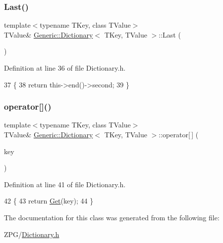 \subsubsection{\texorpdfstring{Last()}{Last()}}
{\footnotesize\ttfamily template$<$typename T\+Key, class T\+Value$>$ \\
T\+Value\& \mbox{\hyperlink{classGeneric_1_1Dictionary}{Generic\+::\+Dictionary}}$<$ T\+Key, T\+Value $>$\+::Last (\begin{DoxyParamCaption}{ }\end{DoxyParamCaption})\hspace{0.3cm}{\ttfamily [inline]}}



Definition at line 36 of file Dictionary.\+h.


\begin{DoxyCode}
37         \{
38             \textcolor{keywordflow}{return} this->end()->second;
39         \}
\end{DoxyCode}
\mbox{\label{classGeneric_1_1Dictionary_a215ba40a8ff1006d0bf288a317758d3f}} 
\subsubsection{\texorpdfstring{operator[]()}{operator[]()}}
{\footnotesize\ttfamily template$<$typename T\+Key, class T\+Value$>$ \\
T\+Value\& \mbox{\hyperlink{classGeneric_1_1Dictionary}{Generic\+::\+Dictionary}}$<$ T\+Key, T\+Value $>$\+::operator\mbox{[}$\,$\mbox{]} (\begin{DoxyParamCaption}\item[{T\+Key}]{key }\end{DoxyParamCaption})\hspace{0.3cm}{\ttfamily [inline]}}



Definition at line 41 of file Dictionary.\+h.


\begin{DoxyCode}
42         \{
43             \textcolor{keywordflow}{return} \mbox{\hyperlink{classGeneric_1_1Dictionary_ad018bc166486129b48e9ededce313984}{Get}}(key);
44         \}
\end{DoxyCode}


The documentation for this class was generated from the following file\+:\begin{DoxyCompactItemize}
\item 
Z\+P\+G/\mbox{\hyperlink{Dictionary_8h}{Dictionary.\+h}}\end{DoxyCompactItemize}

